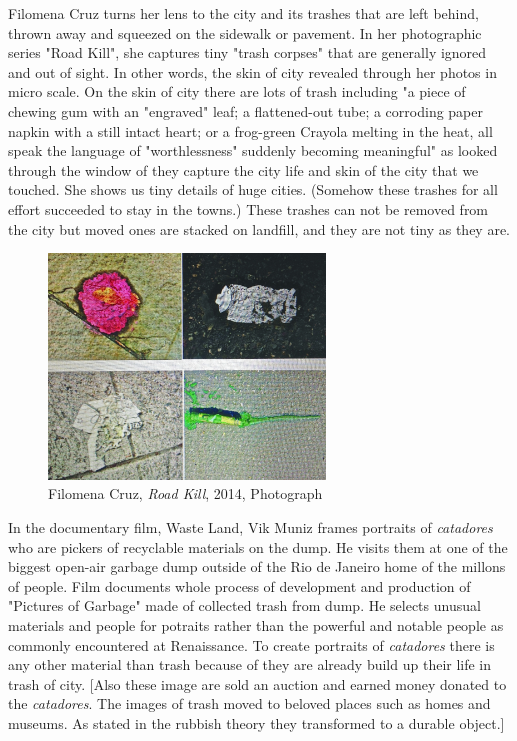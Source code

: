 Filomena Cruz turns her lens to the city and its trashes that are left behind, thrown away and squeezed on the sidewalk or pavement. In her photographic series "Road Kill", she captures tiny "trash corpses" that are generally ignored and out of sight. In other words, the skin of city revealed through her photos in micro scale. On the skin of city there are lots of trash including "a piece of chewing gum with an "engraved" leaf; a flattened-out tube; a corroding paper napkin with a still intact heart; or a frog-green Crayola melting in the heat, all speak the language of "worthlessness" suddenly becoming meaningful" as looked through the window of they capture the city life and skin of the city that we touched. She shows us tiny details of huge cities. (Somehow these trashes for all effort succeeded to stay in the towns.) These trashes can not be removed from the city but moved ones are stacked on landfill, and they are not tiny as they are.

\begin{figure}[h!]
  \centering
  \includegraphics[height=6cm]{graphics/FilomenaCruz_RoadKill_ReVista.jpg}
  \caption{Filomena Cruz, \textit{Road Kill}, 2014, Photograph}
  \label{fig:FilomenaCruz_RoadKill_ReVista}
\end{figure}

In the documentary film, Waste Land, Vik Muniz frames portraits of \textit{catadores} who are pickers of recyclable materials on the dump. He visits them at one of the biggest open-air garbage dump outside of the Rio de Janeiro home of the millons of people. Film documents whole process of development and production of "Pictures of Garbage" made of collected trash from dump. He selects unusual materials and people for potraits rather than the powerful and notable people as commonly encountered at Renaissance. To create portraits of \textit{catadores} there is any other material than trash because of they are already build up their life in trash of city. [Also these image are sold an auction and earned money donated to the \textit{catadores}. The images of trash moved to beloved places such as homes and museums. As stated in the rubbish theory they transformed to a durable object.]

